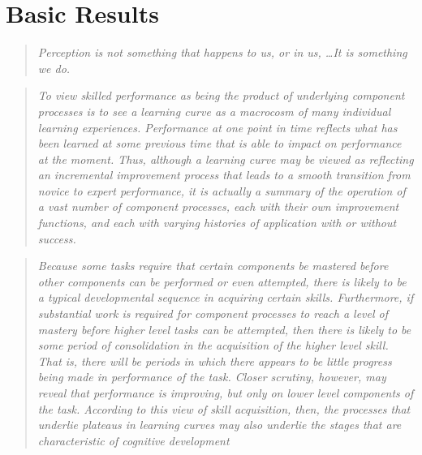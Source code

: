 \documentclass[../main.tex]{subfiles}
\begin{document}
\chapter{Basic Results}\label{chap:basic_results}

\begin{quote}
    \emph{Perception is not something that happens to us, or in us, \lbrack\ldots\rbrack It is something we do.}\\ 
\end{quote}

\begin{quote}
    \emph{To view skilled performance as being the product of underlying component processes is to see a learning curve as a macrocosm of many individual learning experiences. Performance at one point in time reflects what has been learned at some previous time that is able to impact on performance at the moment. Thus, although a learning curve may be viewed as reflecting an incremental improvement process that leads to a smooth transition from novice to expert performance, it is actually a summary of the operation of a vast number of component processes, each with their own improvement functions, and each with varying histories of application with or without success.}\\
\end{quote}

\begin{quote}
    \emph{Because some tasks require that certain components be mastered before other components can be performed or even attempted, there is likely to be a typical developmental sequence in acquiring certain skills. Furthermore, if substantial work is required for component processes to reach a level of mastery before higher level tasks can be attempted, then there is likely to be some period of consolidation in the acquisition of the higher level skill. That is, there will be periods in which there appears to be little progress being made in performance of the task. Closer scrutiny, however, may reveal that performance is improving, but only on lower level components of the task. According to this view of skill acquisition, then, the processes that underlie plateaus in learning curves may also underlie the stages that are characteristic of cognitive development}\\
\end{quote}
\end{document}
